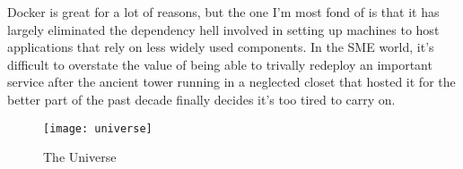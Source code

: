 \documentclass{notarealarticle}
\begin{document}
Docker is great for a lot of reasons, but the one I'm most fond of is that it has largely eliminated the dependency hell involved in setting up machines to host applications that rely on less widely used components.  In the SME world, it's difficult to overstate the value of being able to trivally redeploy an important service after the ancient tower running in a neglected closet that hosted it for the better part of the past decade finally decides it's too tired to carry on.

\begin{figure}[h!]
\centering
\texttt{[image: universe]}
\caption{The Universe}
\label{fig:universe}
\end{figure}
\end{document}

